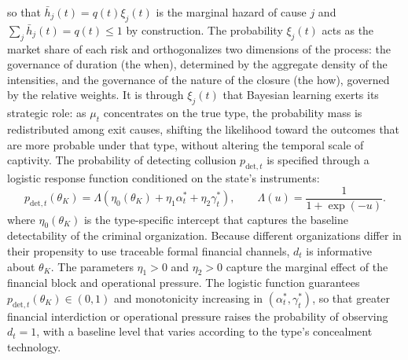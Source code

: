 \documentclass[review,authoryear,12pt]{elsarticle}
\theoremstyle{plain}
\theoremstyle{definition}
\newcommand{\1}{\mathbf{1}}
\begin{document}
so that $\bar h_j(t)=q(t)\xi_j(t)$ is the marginal hazard of cause $j$ and $\sum_j \bar h_j(t)=q(t)\leq 1$ by construction. The probability $\xi_j(t)$ acts as the market share of each risk and orthogonalizes two dimensions of the process: the governance of duration (the when), determined by the aggregate density of the intensities, and the governance of the nature of the closure (the how), governed by the relative weights. It is through $\xi_j(t)$ that Bayesian learning exerts its strategic role: as $\mu_t$ concentrates on the true type, the probability mass is redistributed among exit causes, shifting the likelihood toward the outcomes that are more probable under that type, without altering the temporal scale of captivity. The probability of detecting collusion $p_{\mathrm{det},t}$ is specified through a logistic response function conditioned on the state's instruments:
\begin{equation}
p_{\mathrm{det},t}(\theta_K)=\Lambda(\eta_0(\theta_K)+\eta_1\alpha_t^\ast+\eta_2\gamma_t^\ast),\qquad\Lambda(u)=\frac{1}{1+\exp(-u)}.
\label{eq:detection}
\end{equation}
where $\eta_0(\theta_K)$ is the type-specific intercept that captures the baseline detectability of the criminal organization. Because different organizations differ in their propensity to use traceable formal financial channels, $d_t$ is informative about $\theta_K$. The parameters $\eta_1>0$ and $\eta_2>0$ capture the marginal effect of the financial block and operational pressure. The logistic function guarantees $p_{\mathrm{det},t}(\theta_K)\in(0,1)$ and monotonicity increasing in $(\alpha_t^\ast,\gamma_t^\ast)$, so that greater financial interdiction or operational pressure raises the probability of observing $d_t=1$, with a baseline level that varies according to the type's concealment technology.
\end{document}
